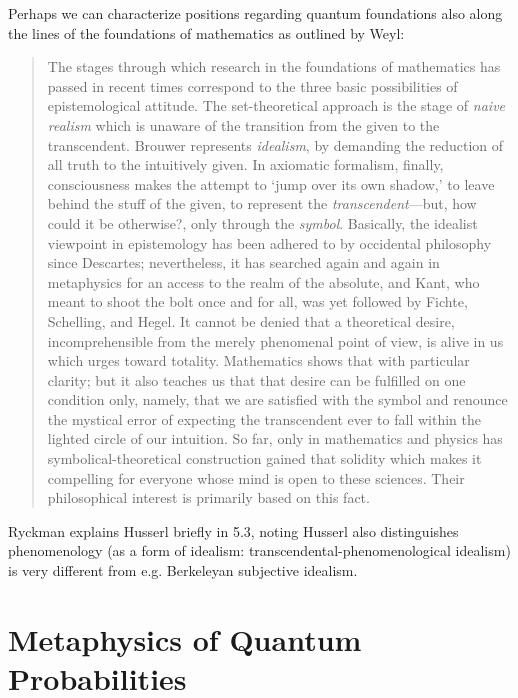 Perhaps we can characterize positions regarding quantum foundations also along the lines of the foundations of mathematics as outlined by Weyl:

\begin{quote}
    The stages through which research in the foundations of mathematics has passed in recent times correspond to the three basic possibilities of epistemological attitude.  The set-theoretical approach is the stage of \emph{naive realism} which is unaware of the transition from the given to the transcendent.  Brouwer represents \emph{idealism}, by demanding the reduction of all truth to the intuitively given.  In axiomatic formalism, finally, consciousness makes the attempt to `jump over its own shadow,' to leave behind the stuff of the given, to represent the \emph{transcendent}---but, how could it be otherwise?, only through the \emph{symbol}.  Basically, the idealist viewpoint in epistemology has been adhered to by occidental philosophy since Descartes; nevertheless, it has searched again and again in metaphysics for an access to the realm of the absolute, and Kant, who meant to shoot the bolt once and for all, was yet followed by Fichte, Schelling, and Hegel.  It cannot be denied that a theoretical desire, incomprehensible from the merely phenomenal point of view, is alive in us which urges toward totality. Mathematics shows that with particular clarity; but it also teaches us that that desire can be fulfilled on one condition only, namely, that we are satisfied with the symbol and renounce the mystical error of expecting the transcendent ever to fall within the lighted circle of our intuition.  So far, only in mathematics and physics has symbolical-theoretical construction gained that solidity which makes it compelling for everyone whose mind is open to these sciences.  Their philosophical interest is primarily based on this fact.

    \citep[p. 65-66]{Weyl1949}
\end{quote}




Ryckman explains Husserl briefly in 5.3, noting Husserl also distinguishes phenomenology (as a form of idealism: transcendental-phenomenological idealism) is very different from e.g. Berkeleyan subjective idealism.





\section{Metaphysics of Quantum Probabilities}


